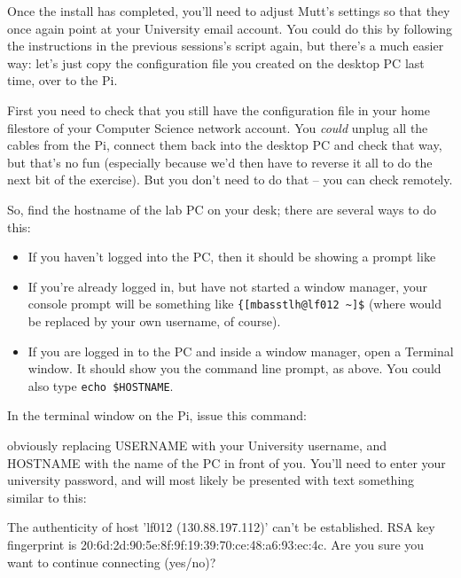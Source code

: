 Once the install has completed, you'll need to adjust Mutt's settings so that they once again point at your University email account. You could do this by following the instructions in the previous sessions's script again, but there's a much easier way: let's just copy the configuration file you created on the desktop PC last time, over to the Pi. 

First you need to check that you still have the  configuration file in your home filestore of your Computer Science network account. You \textit{could} unplug all the cables from the Pi, connect them back into the desktop PC and check that way, but that's no fun (especially because we'd then have to reverse it all to do the next bit of the exercise). But you don't need to do that -- you can check remotely. 

So, find the hostname of the lab PC on your desk; there are several ways to do this:

\begin{itemize}
\item If you haven't logged into the PC, then it should be showing a prompt like  
\item If you're already logged in, but have not started a window manager, your console prompt will be something like  \verb|{[mbasstlh@lf012 ~]$| (where  would be replaced by your own username, of course).
\item If you are logged in to the PC and inside a window manager, open a Terminal window. It should show you the command line prompt, as above. You could also type \verb|echo $HOSTNAME|.
\end{itemize}

In the terminal window on the Pi, issue this command:


obviously replacing USERNAME with your University username, and HOSTNAME with the name of the PC in front of you. You'll need to enter your university password, and will most likely be presented with text something similar to this:

\begin{ttoutenv}
The authenticity of host 'lf012 (130.88.197.112)' can't be established.
RSA key fingerprint is 20:6d:2d:90:5e:8f:9f:19:39:70:ce:48:a6:93:ec:4c.
Are you sure you want to continue connecting (yes/no)? 
\end{ttoutenv}

